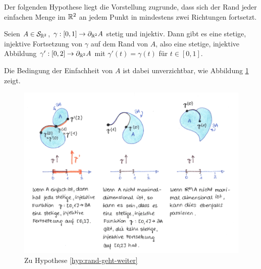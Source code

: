     Der folgenden Hypothese liegt die Vorstellung zugrunde, dass sich der Rand jeder einfachen Menge im $\mathbb{R}^2$ an jedem Punkt in mindestens zwei Richtungen fortsetzt.
    \begin{hyp}\label{hyp:rand-geht-weiter}
        Seien $A \in \mathcal{S}_{\mathbb{R}^2}$, $\gamma : [0,1] \to \partial_{\mathbb{R}^2} A$ stetig und injektiv.
        Dann gibt es eine stetige, injektive Fortsetzung von $\gamma$ auf dem Rand von $A$, 
        also eine stetige, injektive Abbildung $\gamma' : [0,2] \to \partial_{\mathbb{R}^2} A$ mit $\gamma'(t) = \gamma(t)$ für $t \in [0,1]$.
    \end{hyp}
    Die Bedingung der Einfachheit von $A$ ist dabei unverzichtbar, wie Abbildung \ref{fig:rand-geht-weiter} zeigt.
%     
     \begin{figure}[ht]
        \centering
        \includegraphics[width=\textwidth]{bearbeitet-22-04-25/rand-geht-weiter.png}
        \caption{Zu Hypothese \ref{hyp:rand-geht-weiter}}
        \label{fig:rand-geht-weiter}
    \end{figure}


